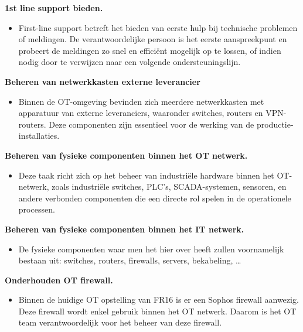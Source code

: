 \textbf{1st line support bieden.}
\begin{itemize}[label=\textbullet]
    \item  First-line support betreft het bieden van eerste hulp bij technische problemen of meldingen. De verantwoordelijke persoon is het eerste aanspreekpunt en probeert de meldingen zo snel en efficiënt mogelijk op te lossen, of indien nodig door te verwijzen naar een volgende ondersteuningslijn.
\end{itemize}

\textbf{Beheren van netwerkkasten externe leverancier}
\begin{itemize}[label=\textbullet]
    \item Binnen de OT-omgeving bevinden zich meerdere netwerkkasten met apparatuur van externe leveranciers, waaronder switches, routers en VPN-routers. Deze componenten zijn essentieel voor de werking van de productie-installaties. 
\end{itemize}

\textbf{Beheren van fysieke componenten binnen het OT netwerk.}
\begin{itemize}[label=\textbullet]
    \item Deze taak richt zich op het beheer van industriële hardware binnen het OT-netwerk, zoals industriële switches, PLC’s, SCADA-systemen, sensoren, en andere verbonden componenten die een directe rol spelen in de operationele processen.
\end{itemize}


\textbf{Beheren van fysieke componenten binnen het IT netwerk.}
\begin{itemize}[label=\textbullet]
    \item De fysieke componenten waar men het hier over heeft zullen voornamelijk bestaan uit: switches, routers, firewalls, servers, bekabeling, …
\end{itemize}

\textbf{Onderhouden OT firewall.}
\begin{itemize}[label=\textbullet]
    \item Binnen de huidige OT opstelling van FR16 is er een Sophos firewall aanwezig. Deze firewall wordt enkel gebruik binnen het OT netwerk. Daarom is het OT team verantwoordelijk voor het beheer van deze firewall.
\end{itemize}



